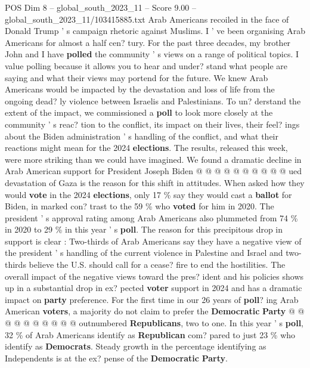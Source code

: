 \begin{textsample}{POS Dim 8 – global\_south\_2023\_11 – Score 9.00 – global\_south\_2023\_11/103415885.txt}  \label{ex:f8_pos_271}
Arab Americans recoiled in the face of Donald Trump ' s campaign rhetoric against Muslims.
I ' ve been organising Arab Americans for almost a half cen? tury.
For the past three decades, my brother John and I have \textbf{polled} the community ' s views on a range of political topics.
I value polling because it allows you to hear and under? stand what people are saying and what their views may portend for the future.
We knew Arab Americans would be impacted by the devastation and loss of life from the ongoing dead? ly violence between Israelis and Palestinians.
To un? derstand the extent of the impact, we commissioned a \textbf{poll} to look more closely at the community ' s reac? tion to the conflict, its impact on their lives, their feel? ings about the Biden administration ' s handling of the conflict, and what their reactions might mean for the 2024 \textbf{elections}.
The results, released this week, were more striking than we could have imagined.
We found a dramatic decline in Arab American support for President Joseph Biden @ @ @ @ @ @ @ @ @ @ ued devastation of Gaza is the reason for this shift in attitudes.
When asked how they would \textbf{vote} in the 2024 \textbf{elections}, only 17 \% say they would cast a \textbf{ballot} for Biden, in marked con? trast to the 59 \% who \textbf{voted} for him in 2020.
The president ' s approval rating among Arab Americans also plummeted from 74 \% in 2020 to 29 \% in this year ' s \textbf{poll}.
The reason for this precipitous drop in support is clear : Two-thirds of Arab Americans say they have a negative view of the president ' s handling of the current violence in Palestine and Israel and two-thirds believe the U.S. should call for a cease? fire to end the hostilities.
The overall impact of the negative views toward the pres? ident and his policies shows up in a substantial drop in ex? pected \textbf{voter} support in 2024 and has a dramatic impact on \textbf{party} preference.
For the first time in our 26 years of \textbf{poll}? ing Arab American \textbf{voters}, a majority do not claim to prefer the \textbf{Democratic} \textbf{Party} @ @ @ @ @ @ @ @ @ @ outnumbered \textbf{Republicans}, two to one.
In this year ' s \textbf{poll}, 32 \% of Arab Americans identify as \textbf{Republican} com? pared to just 23 \% who identify as \textbf{Democrats}.
Steady growth in the percentage identifying as Independents is at the ex? pense of the \textbf{Democratic} \textbf{Party}.

\end{textsample}
